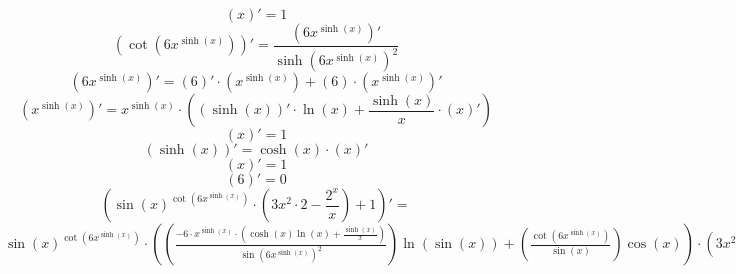 \documentclass[a4paper,12pt]{article} %
\begin{document}
 \newline 
\newline $$ \left( x \right)' = 1$$
 \newline 
\newline $$ \left( \cot \left(  6  x^{ \sinh \left( x\right)}\right) \right)' = \frac{ \left(  6  x^{ \sinh \left( x\right)} \right)'}{  \sinh \left(  6  x^{ \sinh \left( x\right)}\right)^{ 2}}$$
 \newline 
\newline $$ \left(  6  x^{ \sinh \left( x\right)} \right)' =  \left( 6 \right)' \cdot \left(  x^{ \sinh \left( x\right)} \right) +  \left( 6 \right) \cdot \left(  x^{ \sinh \left( x\right)} \right)'$$
 \newline 
\newline $$ \left(  x^{ \sinh \left( x\right)} \right)' =   x^{ \sinh \left( x\right)} \cdot \left( \left( \sinh \left( x\right) \right)' \cdot  \ln \left( x\right) +  \frac{ \sinh \left( x\right)}{ x} \cdot \left( x \right)' \right)$$
 \newline 
\newline $$ \left( x \right)' = 1$$
 \newline 
\newline $$ \left( \sinh \left( x\right) \right)' =  \cosh \left( x\right) \cdot  \left( x \right)'$$
 \newline 
\newline $$ \left( x \right)' = 1$$
 \newline 
\newline $$ \left( 6 \right)' = 0$$
 \newline{} $$
 \left(    \sin \left( x\right)^{ \cot \left(  6  x^{ \sinh \left( x\right)}\right)}\cdot \left(    3  x^{ 2}\cdot  2- \frac{  2^{ x}}{ x}\right)+ 1 \right)'= $$ \newline $     \sin \left( x\right)^{ \cot \left(  6  x^{ \sinh \left( x\right)}\right)}\cdot \left(  \left( \frac{ -  6\cdot    x^{ \sinh \left( x\right)}\cdot \left(   \cosh \left( x\right) \ln \left( x\right)+ \frac{ \sinh \left( x\right)}{ x}\right)}{  \sin \left(  6  x^{ \sinh \left( x\right)}\right)^{ 2}}\right) \ln \left( \sin \left( x\right)\right)+ \left( \frac{ \cot \left(  6  x^{ \sinh \left( x\right)}\right)}{ \sin \left( x\right)}\right) \cos \left( x\right)\right)\cdot \left(    3  x^{ 2}\cdot  2- \frac{  2^{ x}}{ x}\right)+   \sin \left( x\right)^{ \cot \left(  6  x^{ \sinh \left( x\right)}\right)}\cdot \left(    3\cdot   2 x\cdot  2- \frac{     2^{ x} \ln \left( 2\right)\cdot  x-  2^{ x}}{  x^{ 2}}\right)$
\end{document}
